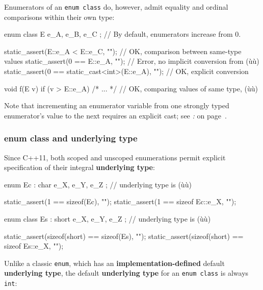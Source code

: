 \noindent Enumerators of an \texttt{enum}~\texttt{class} do, however, admit
equality and ordinal comparisons within their own type:

\begin{emcppslisting}[emcppsbatch=e4]
enum class E { e_A, e_B, e_C };  // By default, enumerators increase from 0.

static_assert(E::e_A < E::e_C, "");  // OK, comparison between same-type values
static_assert(0 == E::e_A, "");      // Error, no implicit conversion from (ù{}ù)
static_assert(0 == static_cast<int>(E::e_A), "");  // OK, explicit conversion

void f(E v)
{
    if (v > E::e_A) { /* ... */ }  // OK, comparing values of same type, (ù{}ù)
}
\end{emcppslisting}

\noindent Note that incrementing an enumerator variable from one strongly typed
enumerator's value to the next requires an explicit cast; see \textit{: } on page~\pageref{strong-typing-of-an-enum-class-can-be-counterproductive}.

\subsubsection[{\tt enum} {\tt class} and underlying type]{{\SubsubsecCode enum} {\SubsubsecCode class} and underlying type}\label{enum-class-and-underlying-type}

Since C++11, both scoped and unscoped enumerations permit explicit
specification of their integral \textbf{underlying type}:

\begin{emcppslisting}
enum Ec : char { e_X, e_Y, e_Z };
    // underlying type is (ù{}ù)

static_assert(1 == sizeof(Ec),     "");
static_assert(1 == sizeof Ec::e_X, "");

enum class Es : short { e_X, e_Y, e_Z };
    // underlying type is (ù{}ù)

static_assert(sizeof(short) == sizeof(Es),     "");
static_assert(sizeof(short) == sizeof Es::e_X, "");
\end{emcppslisting}

\noindent Unlike a classic \texttt{enum}, which has an
\textbf{implementation-defined} default \textbf{underlying type}, the
default \textbf{underlying type} for an \texttt{enum}~\texttt{class} is
always \texttt{int}:

